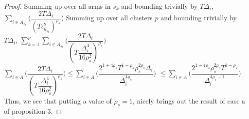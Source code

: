 \begin{proof}
\newline
Summing up over all arms in $s_{k}$ and bounding trivially by $T\Delta_{i}$,
$\sum_{i\in A_{s_{k}}}\bigg(\dfrac{2T\Delta_{i}}{(T\epsilon_{g_{s_{k}}}^{2})^{\rho_{s}}}\bigg)$
\newline
Summing up over all clusters $p$ and bounding trivially by $T\Delta_{i}$,
\newline\hspace*{4em} $\sum_{k=1}^{p}\sum_{i\in A_{s_{k}}}\bigg(\dfrac{2T\Delta_{i}}{(T\dfrac{\Delta_{i}^{4}}{16\rho_{s}^{2}})^{\rho_{s}}}\bigg)$
\newline\hspace*{4em} $\sum_{i\in A}\bigg(\dfrac{2T\Delta_{i}}{(T\dfrac{\Delta_{i}^{4}}{16\rho_{s}^{2}})^{\rho_{s}}}\bigg)\leq \sum_{i\in A}\bigg(\dfrac{2^{1+4\rho_{s}}T^{1-\rho_{s}}\rho_{s}^{2\rho_{s}}\Delta_{i}}{\Delta_{i}^{4\rho_{s}}}\bigg)$
\newline\hspace*{12em}
$\leq \sum_{i\in A}\bigg(\dfrac{2^{1+4\rho_{s}}\rho_{s}^{2\rho_{s}}T^{1-\rho_{s}}}{\Delta_{i}^{4\rho_{s}-1}}\bigg)$
\newline Thus, we see that putting a value of $\rho_{s}=1$, nicely brings out the result of case a of proposition $3$.


\end{proof}
